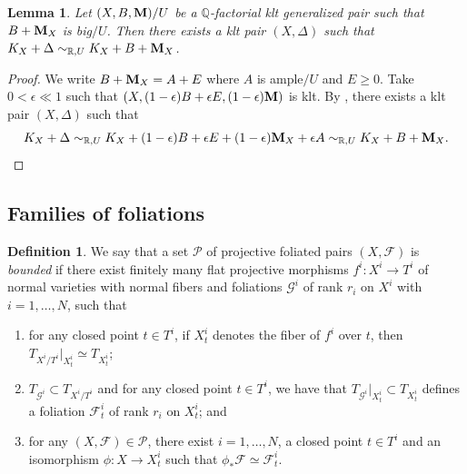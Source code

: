 \documentclass[12pt]{amsart}
\numberwithin{equation}{section}
\newcommand{\Mm}{{\bf{M}}}
\newtheorem{lem}[thm]{Lemma}
\theoremstyle{definition}
\newtheorem{defn}[thm]{Definition}
\theoremstyle{definition}
\theoremstyle{definition}
\begin{document}
\begin{lem}\label{lem: perturb gklt to klt}
    Let $(X,B,\Mm)/U$ be a $\mathbb Q$-factorial klt generalized pair such that $B+\Mm_X$ is big$/U$. Then there exists a klt pair $(X,\Delta)$ such that $K_X+\Delta\sim_{\mathbb R,U}K_X+B+\Mm_X$.
\end{lem}
\begin{proof}
    We write $B+\Mm_X=A+E$ where $A$ is ample$/U$ and $E\geq 0$. Take $0<\epsilon\ll 1$ such that $(X,(1-\epsilon)B+\epsilon E,(1-\epsilon)\Mm)$ is klt. By \cite[Lemma 3.4]{HL22}, there exists a klt pair $(X,\Delta)$ such that 
    $$K_X+\Delta\sim_{\mathbb R,U}K_X+(1-\epsilon)B+\epsilon E+(1-\epsilon)\Mm_X+\epsilon A\sim_{\mathbb R,U}K_X+B+\Mm_X.$$
\end{proof}

\subsection{Families of foliations}

\begin{defn}\label{d_bounded}
    We say that a set $\mathcal P$ of projective foliated pairs $(X,\mathcal F)$ is \emph{bounded} if there exist finitely many flat projective morphisms $f^i\colon X^i\to T^i$ of normal varieties with normal fibers and foliations $\mathcal G^i$ of rank $r_i$ on $X^i$ with $i=1,\dots,N$, such that 
    \begin{enumerate}
    \item for any closed point $t\in T^i$, if $X^i_t$ denotes the fiber of $f^i$ over $t$, then $T_{X^i/T^i}|_{X^i_t}\simeq T_{X^i_t}$; 
    \item $T_{\mathcal G^i}\subset T_{X^i/T^i}$ and for any closed point 
    $t\in T^i$, we have that $T_{\mathcal G^i}|_{X^i_t}\subset T_{X^i_t}$ defines a foliation ${\mathcal F^i_t}$ of rank $r_i$ on $X_t^i$; and 
    \item for any  $(X,\mathcal F)\in \mathcal P$, there exist $i=1,\dots,N$, a closed point $t\in T^i$ and an isomorphism $\phi\colon X\to X^i_t$ such that $\phi_*\mathcal F\simeq \mathcal F^i_t$.
    \end{enumerate}
\end{defn}
\end{document}
